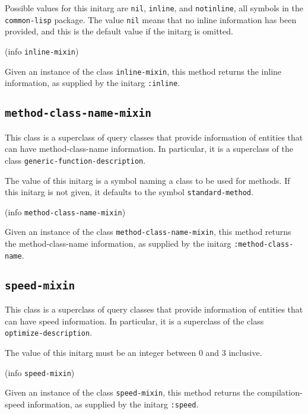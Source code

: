 Possible values for this initarg are \texttt{nil}, \texttt{inline},
and \texttt{notinline}, all symbols in the \texttt{common-lisp}
package.  The value \texttt{nil} means that no inline information has
been provided, and this is the default value if the initarg is omitted.

 {(info {\tt inline-mixin})}

Given an instance of the class \texttt{inline-mixin}, this method
returns the inline information, as supplied by the initarg
\texttt{:inline}.

\subsection{\texttt{method-class-name-mixin}}
\label{sec-method-class-name-mixin}

This class is a superclass of query classes that provide information
of entities that can have method-class-name information.  In
particular, it is a superclass of the class
\texttt{generic-function-description}.


The value of this initarg is a symbol naming a class to be used for
methods.  If this initarg is not given, it defaults to the symbol
\texttt{standard-method}.

 {(info {\tt method-class-name-mixin})}

Given an instance of the class \texttt{method-class-name-mixin}, this
method returns the method-class-name information, as supplied by the
initarg \texttt{:method-class-name}.

\subsection{\texttt{speed-mixin}}
\label{sec-speed-mixin}

This class is a superclass of query classes that provide information
of entities that can have speed information.  In particular, it is a
superclass of the class \texttt{optimize-description}.


The value of this initarg must be an integer between $0$ and $3$
inclusive.

 {(info {\tt speed-mixin})}

Given an instance of the class \texttt{speed-mixin}, this method
returns the compilation-speed information, as supplied by the initarg
\texttt{:speed}.

